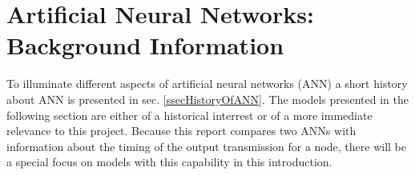 % 			
% 			
% 			
% 			
% 			
% 			

\section{Artificial Neural Networks: Background Information}
\label{secANNhistory}
To illuminate different aspects of artificial neural networks (ANN) a short history about ANN is presented in sec. \ref{ssecHistoryOfANN}. 
The models presented in the following section are either of a historical interrest or of a more immediate relevance to this project.
Because this report compares two ANNs with information about the timing of the output transmission for a node, there will be a special focus on models with this capability in this introduction.  %



